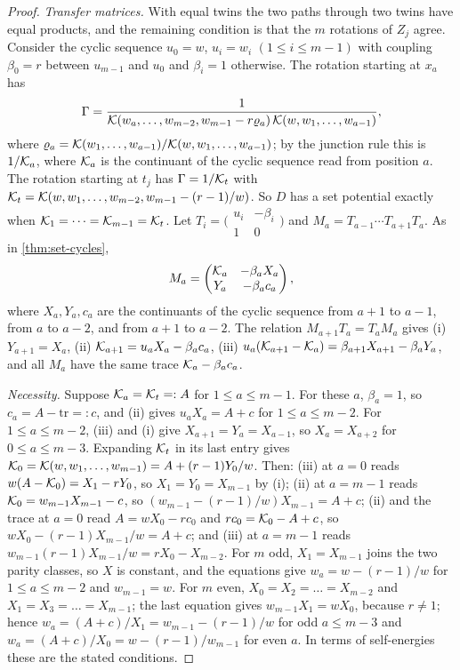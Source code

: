 \begin{proof}
\emph{Transfer matrices.} With equal twins the two paths through two twins have equal products, and the remaining condition is that the $m$ rotations of $Z_j$ agree. Consider the cyclic sequence $u_0=w$, $u_i=w_i$ $(1\le i\le m-1)$ with coupling $\beta_0=r$ between $u_{m-1}$ and $u_0$ and $\beta_i=1$ otherwise. The rotation starting at $x_a$ has
\[
\Gamma=\frac{1}{\mathcal{K}(w_a,\dots,w_{m-2},w_{m-1}-r\varrho_a)\,\mathcal{K}(w,w_1,\dots,w_{a-1})},
\]
where $\varrho_a=\mathcal{K}(w_1,\dots,w_{a-1})/\mathcal{K}(w,w_1,\dots,w_{a-1})$; by the junction rule this is $1/\mathcal{K}_a$, where $\mathcal{K}_a$ is the continuant of the cyclic sequence read from position $a$. The rotation starting at $t_j$ has $\Gamma=1/\mathcal{K}_t$ with $\mathcal{K}_t=\mathcal{K}(w,w_1,\dots,w_{m-2},w_{m-1}-(r-1)/w)$. So $D$ has a set potential exactly when $\mathcal{K}_1=\dots=\mathcal{K}_{m-1}=\mathcal{K}_t$. Let $T_i=\bigl(\begin{smallmatrix}u_i&-\beta_i\\1&0\end{smallmatrix}\bigr)$ and $M_a=T_{a-1}\cdots T_{a+1}T_a$. As in \cref{thm:set-cycles},
\[
M_a=\begin{pmatrix}\mathcal{K}_a&-\beta_aX_a\\Y_a&-\beta_ac_a\end{pmatrix},
\]
where $X_a,Y_a,c_a$ are the continuants of the cyclic sequence from $a+1$ to $a-1$, from $a$ to $a-2$, and from $a+1$ to $a-2$. The relation $M_{a+1}T_a=T_aM_a$ gives (i) $Y_{a+1}=X_a$, (ii) $\mathcal{K}_{a+1}=u_aX_a-\beta_ac_a$, (iii) $u_a(\mathcal{K}_{a+1}-\mathcal{K}_a)=\beta_{a+1}X_{a+1}-\beta_aY_a$, and all $M_a$ have the same trace $\mathcal{K}_a-\beta_ac_a$.

\emph{Necessity.} Suppose $\mathcal{K}_a=\mathcal{K}_t=:A$ for $1\le a\le m-1$. For these $a$, $\beta_a=1$, so $c_a=A-\mathrm{tr}=:c$, and (ii) gives $u_aX_a=A+c$ for $1\le a\le m-2$. For $1\le a\le m-2$, (iii) and (i) give $X_{a+1}=Y_a=X_{a-1}$, so $X_a=X_{a+2}$ for $0\le a\le m-3$. Expanding $\mathcal{K}_t$ in its last entry gives $\mathcal{K}_0=\mathcal{K}(w,w_1,\dots,w_{m-1})=A+(r-1)Y_0/w$. Then: (iii) at $a=0$ reads $w(A-\mathcal{K}_0)=X_1-rY_0$, so $X_1=Y_0=X_{m-1}$ by (i); (ii) at $a=m-1$ reads $\mathcal{K}_0=w_{m-1}X_{m-1}-c$, so $(w_{m-1}-(r-1)/w)X_{m-1}=A+c$; (ii) and the trace at $a=0$ read $A=wX_0-rc_0$ and $rc_0=\mathcal{K}_0-A+c$, so $wX_0-(r-1)X_{m-1}/w=A+c$; and (iii) at $a=m-1$ reads $w_{m-1}(r-1)X_{m-1}/w=rX_0-X_{m-2}$. For $m$ odd, $X_1=X_{m-1}$ joins the two parity classes, so $X$ is constant, and the equations give $w_a=w-(r-1)/w$ for $1\le a\le m-2$ and $w_{m-1}=w$. For $m$ even, $X_0=X_2=\dots=X_{m-2}$ and $X_1=X_3=\dots=X_{m-1}$; the last equation gives $w_{m-1}X_1=wX_0$, because $r\neq1$; hence $w_a=(A+c)/X_1=w_{m-1}-(r-1)/w$ for odd $a\le m-3$ and $w_a=(A+c)/X_0=w-(r-1)/w_{m-1}$ for even $a$. In terms of self-energies these are the stated conditions.


\end{proof}
